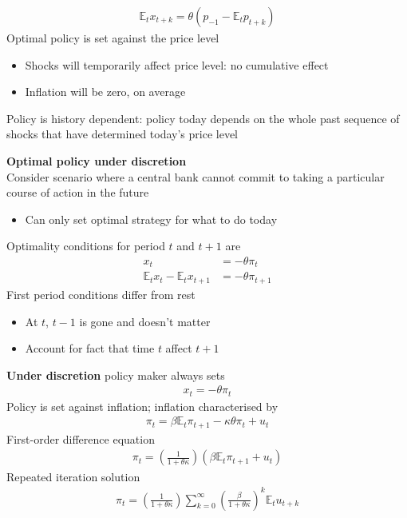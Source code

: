 \documentclass{beamer}
\begin{document}
\begin{frame}
  \begin{align}  
  \mathbb{E}_t x_{t+k} = \theta(p_{-1} - \mathbb{E}_tp_{t+k}) 
\end{align}
\medskip
Optimal policy is set against the price level
\begin{itemize}
  \item Shocks will temporarily affect price level: no cumulative effect
  \item Inflation will be zero, on average
\end{itemize}
\medskip
Policy is history dependent: policy today depends on the whole past sequence of shocks that have determined today's price level
\end{frame}


\begin{frame}
  \textbf{Optimal policy under discretion}\\  
  Consider scenario where a central bank cannot commit to taking a particular course of action in the future
  \begin{itemize}
    \item Can only set optimal strategy for what to do today    
  \end{itemize}
  \medskip
  Optimality conditions for period $t$ and $t+1$ are
\begin{align}
  x_t &= -\theta\pi_t\\
  \mathbb{E}_tx_t - \mathbb{E}_tx_{t+1} &= -\theta\pi_{t+1}
\end{align}
 \medskip
 First period conditions differ from rest
\begin{itemize}
   \item At $t$, $t-1$ is gone and doesn't matter
   \item Account for fact that time $t$ affect $t+1$
 \end{itemize} 
\end{frame}

\begin{frame}
 \textbf{Under discretion} policy maker always sets 
\begin{align}
  x_t=-\theta\pi_t
\end{align}
Policy is set against inflation; inflation characterised by 
\begin{align}
  \pi_t=\beta \mathbb{E}_t\pi_{t+1}-\kappa\theta\pi_t+u_t
\end{align}
\medskip
First-order difference equation
\begin{align}
  \pi_t=\left(\frac{1}{1+\theta\kappa}\right) (\beta \mathbb{E}_t\pi_{t+1} + u_t)
\end{align}
\medskip
Repeated iteration solution
\begin{align}
  \pi_t = \left(\frac{1}{1+\theta\kappa}\right) \sum_{k=0}^{\infty} \left(\frac{\beta}{1+\theta\kappa}\right)^k \mathbb{E}_tu_{t+k}
\end{align}
\end{frame}
\end{document}
